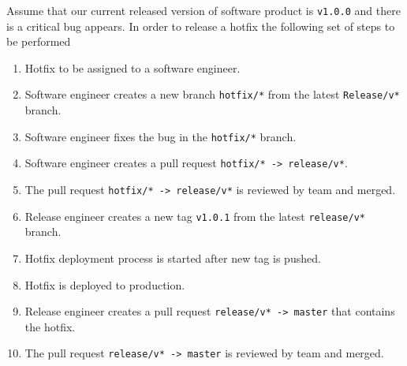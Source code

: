 ﻿Assume that our current released version of software product is \texttt{v1.0.0}
and there is a critical bug appears.
In order to release a hotfix the following set of steps to be performed
\begin{enumerate}
    \item Hotfix to be assigned to a software engineer.
    \item Software engineer creates a new branch \texttt{hotfix/*} from the latest \texttt{Release/v*} branch.
    \item Software engineer fixes the bug in the \texttt{hotfix/*} branch.
    \item Software engineer creates a pull request \texttt{hotfix/* -> release/v*}.
    \item The pull request \texttt{hotfix/* -> release/v*} is reviewed by team and merged.
    \item Release engineer creates a new tag \texttt{v1.0.1} from the latest \texttt{release/v*} branch.
    \item Hotfix deployment process is started after new tag is pushed.
    \item Hotfix is deployed to production.
    \item Release engineer creates a pull request \texttt{release/v* -> master} that contains the hotfix.
    \item The pull request \texttt{release/v* -> master} is reviewed by team and merged.
\end{enumerate}

